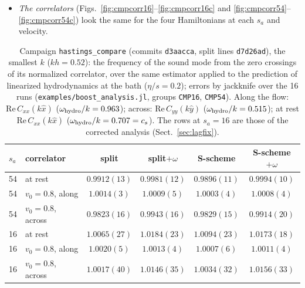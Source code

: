 \documentclass[11pt,aps,preprint,nofootinbib,superscriptaddress,tightenlines]{revtex4-2}
\def\Sect#1{Sect.~\ref{#1}}
\def\Fig#1{Fig.~\ref{#1}}
\begin{document}
\begin{itemize}
  rest (split $0.9912\pm0.0013$, S-scheme $0.9896\pm0.0011$) and 1.7\% slow across the flow, so after the five oscillations shown in \Fig{fig:cmpcorr54} the phase
  lags hydrodynamics by a tenth of a period; with $\omega$ it is $0.998$--$0.999$ at rest and $0.991$--$0.994$ across the flow.  The positional counterterm is a
  modest improvement that keeps the sound in phase at $s_a=54$: the speed of sound of the fluid is that of the equation of state once the offset of the
  positions (level 2) is removed.  Along the flow the Doppler shift dominates, $\omega/k$ depends on $c_s$ only through $(1-v^2)$, and all four are within
  $0.15\%$.  At $s_a=16$ the four are within 2\% of hydrodynamics: along the flow within $0.2\%$, at rest and across the flow $1.007$--$1.018$, and there
  $\omega$ makes the sound slightly faster (by about 1\%) for both schemes.
\item \emph{The correlators} (Figs.~\ref{fig:cmpcorr16}--\ref{fig:cmpcorr16c} and \ref{fig:cmpcorr54}--\ref{fig:cmpcorr54c}) look the same for the four Hamiltonians at each $s_a$ and velocity.
\end{itemize}
\begin{table}
\caption{Campaign \texttt{hastings\_compare} (commits \texttt{d3aacca}, split lines \texttt{d7d26ad}), the smallest $k$ ($kh=0.52$): the frequency of the sound
mode from the zero crossings of its normalized correlator, over the same estimator applied to the prediction of linearized hydrodynamics at the bath
($\eta/s=0.2$); errors by jackknife over the 16 runs (\texttt{examples/boost\_analysis.jl}, groups \texttt{CMP16}, \texttt{CMP54}).  Along the flow:
$\mathrm{Re}\,C_{xx}(k\hat x)$ ($\omega_{\rm hydro}/k=0.963$); across: $\mathrm{Re}\,C_{yy}(k\hat y)$ ($\omega_{\rm hydro}/k=0.515$); at rest
$\mathrm{Re}\,C_{xx}(k\hat x)$ ($\omega_{\rm hydro}/k=0.707=c_s$).  The rows at $s_a=16$ are those of the corrected analysis (\Sect{sec:lagfix}).}
\label{tab:cmpsound}
\begin{center}
\begin{tabular}{llcccc}
\toprule
$s_a$ & correlator & split & split$+\omega$ & S-scheme & S-scheme$+\omega$ \\
\midrule
54 & at rest           & $0.9912(13)$ & $0.9981(12)$ & $0.9896(11)$ & $0.9994(10)$ \\
54 & $v_0=0.8$, along  & $1.0014(3)$  & $1.0009(5)$  & $1.0003(4)$  & $1.0008(4)$ \\
54 & $v_0=0.8$, across & $0.9823(16)$ & $0.9943(16)$ & $0.9829(15)$ & $0.9914(20)$ \\
\midrule
16 & at rest           & $1.0065(27)$ & $1.0184(23)$ & $1.0094(23)$ & $1.0173(18)$ \\
16 & $v_0=0.8$, along  & $1.0020(5)$  & $1.0013(4)$  & $1.0007(6)$  & $1.0011(4)$ \\
16 & $v_0=0.8$, across & $1.0017(40)$ & $1.0146(35)$ & $1.0034(32)$ & $1.0156(33)$ \\
\bottomrule
\end{tabular}
\end{center}
\end{table}
\end{document}
